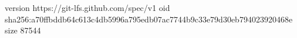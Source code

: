 version https://git-lfs.github.com/spec/v1
oid sha256:a70ffbddb64c613c4db5996a795edb07ac7744b9c33e79d30eb794023920468e
size 87544
